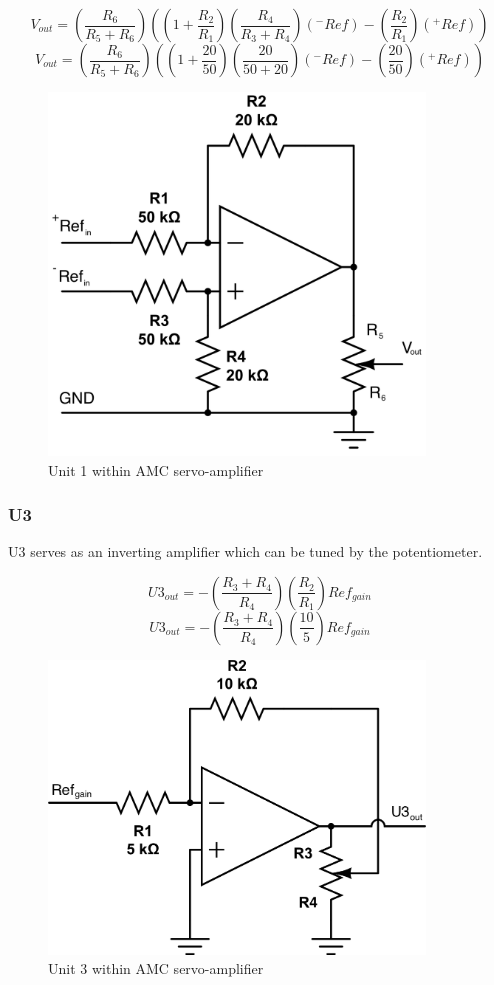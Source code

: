 \documentclass{article}
\theoremstyle{plain}
\theoremstyle{definition}
\theoremstyle{remark}
\begin{document}
$$ V_{out} = \left( \frac{R_6}{R_5+R_6} \right) \left( \left(1 + \frac{R_2}{R_1} \right) \left( \frac{R_4}{R_3+R_4} \right) (^-Ref) - \left( \frac{R_2}{R_1} \right) (^+Ref) \right) $$
$$ V_{out} = \left( \frac{R_6}{R_5+R_6} \right) \left( \left(1+ \frac{20}{50} \right) \left( \frac{20}{50+20} \right)(^-Ref) - \left( \frac{20}{50} \right) (^+Ref) \right) $$

\begin{figure}
\begin{center}
\includegraphics[width = 10cm]{q1a_u1.png}
\caption{Unit 1 within AMC servo-amplifier}
\label{q1_au1}
\end{center}
\end{figure}

\subsubsection*{U3}

U3 serves as an inverting amplifier which can be tuned by the potentiometer.

$$U3_{out} = - \left( \frac{R_3 + R_4}{R_4} \right) \left( \frac{R_2}{R_1} \right) Ref_{gain} $$
$$U3_{out} = - \left( \frac{R_3 + R_4}{R_4} \right) \left( \frac{10}{5} \right) Ref_{gain} $$

\begin{figure}
\begin{center}
\includegraphics[width = 10cm]{q1a_u3.png}
\caption{Unit 3 within AMC servo-amplifier}
\label{q1_au3}
\end{center}
\end{figure}
\end{document}

